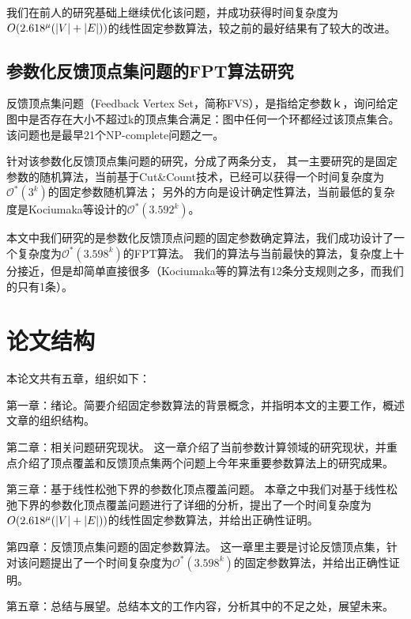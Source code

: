 我们在前人的研究基础上继续优化该问题，并成功获得时间复杂度为$O(2.618^{\mu}(\left\vert V \right\vert+\left\vert E \right\vert))$的线性固定参数算法，较之前的最好结果有了较大的改进。
\subsection{参数化反馈顶点集问题的FPT算法研究}
反馈顶点集问题（Feedback Vertex Set，简称FVS），是指给定参数ｋ，询问给定图中是否存在大小不超过k的顶点集合满足：图中任何一个环都经过该顶点集合。
该问题也是最早21个NP-complete问题之一。

针对该参数化反馈顶点集问题的研究，分成了两条分支，
其一主要研究的是固定参数的随机算法，当前基于Cut\&Count技术，已经可以获得一个时间复杂度为$\mathcal{O}^*(3^k)$的固定参数随机算法；
另外的方向是设计确定性算法，当前最低的复杂度是Kociumaka等设计的$\mathcal{O}^*(3.592^k)$。

本文中我们研究的是参数化反馈顶点问题的固定参数确定算法，我们成功设计了一个复杂度为$\mathcal{O}^*(3.598^k)$的FPT算法。
我们的算法与当前最快的算法，复杂度上十分接近，但是却简单直接很多（Kociumaka等的算法有12条分支规则之多，而我们的只有1条）。

\section{论文结构}
本论文共有五章，组织如下：

第一章：绪论。简要介绍固定参数算法的背景概念，并指明本文的主要工作，概述文章的组织结构。

第二章：相关问题研究现状。
这一章介绍了当前参数计算领域的研究现状，并重点介绍了顶点覆盖和反馈顶点集两个问题上今年来重要参数算法上的研究成果。

第三章：基于线性松弛下界的参数化顶点覆盖问题。
本章之中我们对基于线性松弛下界的参数化顶点覆盖问题进行了详细的分析，提出了一个时间复杂度为$O(2.618^{\mu}(\left\vert V \right\vert+\left\vert E \right\vert))$的线性固定参数算法，并给出正确性证明。

第四章：反馈顶点集问题的固定参数算法。
这一章里主要是讨论反馈顶点集，针对该问题提出了一个时间复杂度为$\mathcal{O}^*(3.598^k)$的固定参数算法，并给出正确性证明。

第五章：总结与展望。总结本文的工作内容，分析其中的不足之处，展望未来。
